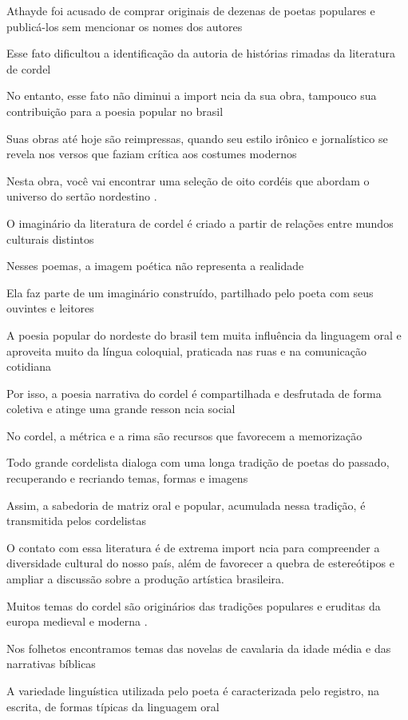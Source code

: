 \documentclass[12pt]{extarticle}
\begin{document}
Athayde foi acusado de comprar originais de dezenas de poetas populares e publicá-los sem mencionar os nomes dos autores

Esse fato dificultou a identificação da autoria de histórias rimadas da literatura de cordel

No entanto, esse fato não diminui a import ncia da sua obra, tampouco sua contribuição para a poesia popular no brasil

Suas obras até hoje são reimpressas, quando seu estilo irônico e jornalístico se revela nos versos que faziam crítica aos costumes modernos

Nesta obra,  você vai encontrar uma seleção de oito cordéis  que abordam o universo do sertão nordestino .

O imaginário da literatura de cordel  é criado a partir de relações entre mundos culturais distintos  

Nesses poemas,  a imagem poética não representa a realidade 

Ela faz parte de um imaginário construído,  partilhado pelo  poeta  com seus ouvintes e leitores 

A poesia popular do nordeste do brasil  tem muita influência da linguagem oral  e  aproveita muito da língua coloquial,  praticada nas ruas e na comunicação cotidiana  

Por isso,  a poesia narrativa do cordel  é compartilhada e desfrutada de forma coletiva  e atinge uma grande resson ncia social  

No cordel,  a métrica e a rima são recursos que favorecem a memorização 

Todo grande cordelista dialoga com uma longa tradição de poetas do passado,  recuperando e recriando  temas,  formas  e imagens 

Assim,  a sabedoria de matriz oral e popular,  acumulada nessa tradição,  é transmitida pelos cordelistas 

O contato com essa literatura  é de extrema import ncia para compreender  a diversidade cultural do nosso país,  além de favorecer a quebra de estereótipos  e ampliar a discussão sobre a produção artística brasileira. 

Muitos temas do cordel  são originários das tradições populares e eruditas da europa medieval e moderna .

Nos folhetos  encontramos temas das novelas de cavalaria da idade média  e das narrativas bíblicas 

A variedade linguística utilizada pelo poeta é caracterizada pelo registro, na escrita, de formas típicas da linguagem oral
\end{document}

